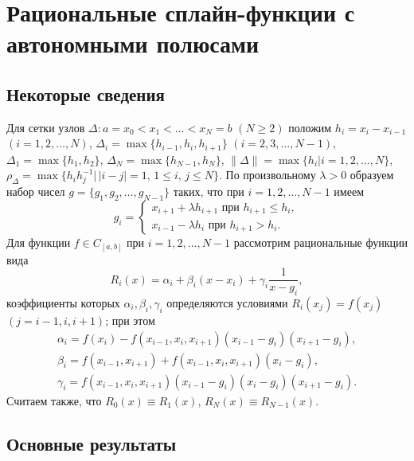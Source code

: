 \chapter{Рациональные сплайн-функции с автономными полюсами}
\section{Некоторые сведения}

Для сетки узлов $\Delta: a=x_0<x_1<\dots<x_N=b$ $(N\geqslant 2)$ положим $h_i=x_i-x_{i-1}$ $(i=1,2,\dots,N)$,
$\Delta_i=\max\{h_{i-1},h_i, h_{i+1}\}$ $(i=2,3,\dots,N-1)$, $\Delta_1=\max\{h_1,h_2\}$, $\Delta_N=\max\{h_{N-1}, h_N\}$,
$\|\Delta\|=\max\{h_i|i=1,2,\dots,N\}$, $\rho_\Delta=\max\{h_i h_j^{-1}|\,|i-j|=1,\,1 \leqslant i,\, j\leqslant N\}$.
По произвольному $\lambda>0$ образуем набор чисел $g=\{g_1,g_2,\dots,g_{N-1}\}$ таких, что при $i=1,2,\dots,N-1$ имеем
\begin{equation}\label{rark1}
g_i= \left\{
\begin{array}{l}
x_{i+1}+\lambda h_{i+1}\text{ при } h_{i+1}\leqslant h_i,\\[1ex]
x_{i-1}-\lambda h_i\text{ при } h_{i+1}> h_i.
\end{array}
\right.
\end{equation}
Для функции $f\in C_{[a,b]}$ при $i=1,2,\dots,N-1$ рассмотрим рациональные функции вида
\begin{equation}\label{rark2}
R_i(x)=\alpha_i+\beta_i (x-x_i)+\gamma_i \frac 1{x-g_i},
\end{equation}
коэффициенты которых $\alpha_i, \beta_i,\gamma_i$ определяются условиями $R_i(x_j)=f(x_j)$ $(j=i-1,i,i+1)$;
при этом
\begin{equation*}
\begin{array}{l}
\alpha_i=f(x_i)-f(x_{i-1}, x_i, x_{i+1})(x_{i-1}-g_i)(x_{i+1}-g_i),\\[1ex]
\beta_i=f(x_{i-1}, x_{i+1})+f(x_{i-1}, x_i, x_{i+1})(x_i-g_i),\\[1ex]
\gamma_i=f(x_{i-1}, x_i, x_{i+1})(x_{i-1}-g_i)(x_i-g_i)(x_{i+1}-g_i).
\end{array}
\end{equation*}
Считаем также, что $R_0(x)\equiv R_1(x)$, $R_N(x)\equiv R_{N-1}(x)$.
\section{Основные результаты}

